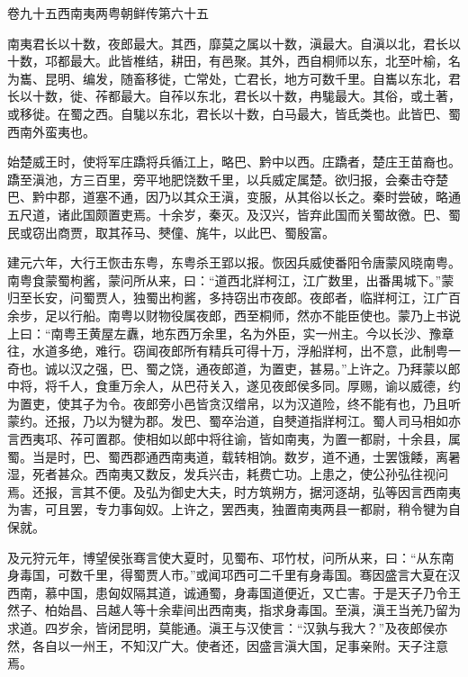 \documentclass[12pt,UTF8]{ctexbook}
\begin{document}
卷九十五西南夷两粤朝鲜传第六十五



南夷君长以十数，夜郎最大。其西，靡莫之属以十数，滇最大。自滇以北，君长以十数，邛都最大。此皆椎结，耕田，有邑聚。其外，西自桐师以东，北至叶榆，名为巂、昆明、编发，随畜移徙，亡常处，亡君长，地方可数千里。自巂以东北，君长以十数，徙、莋都最大。自莋以东北，君长以十数，冉駹最大。其俗，或土著，或移徙。在蜀之西。自駹以东北，君长以十数，白马最大，皆氐类也。此皆巴、蜀西南外蛮夷也。



始楚威王时，使将军庄蹻将兵循江上，略巴、黔中以西。庄蹻者，楚庄王苗裔也。蹻至滇池，方三百里，旁平地肥饶数千里，以兵威定属楚。欲归报，会秦击夺楚巴、黔中郡，道塞不通，因乃以其众王滇，变服，从其俗以长之。秦时尝破，略通五尺道，诸此国颇置吏焉。十余岁，秦灭。及汉兴，皆弃此国而关蜀故徼。巴、蜀民或窃出商贾，取其莋马、僰僮、旄牛，以此巴、蜀殷富。



建元六年，大行王恢击东粤，东粤杀王郢以报。恢因兵威使番阳令唐蒙风晓南粤。南粤食蒙蜀枸酱，蒙问所从来，曰：“道西北牂柯江，江广数里，出番禺城下。”蒙归至长安，问蜀贾人，独蜀出枸酱，多持窃出市夜郎。夜郎者，临牂柯江，江广百余步，足以行船。南粤以财物役属夜郎，西至桐师，然亦不能臣使也。蒙乃上书说上曰：“南粤王黄屋左纛，地东西万余里，名为外臣，实一州主。今以长沙、豫章往，水道多绝，难行。窃闻夜郎所有精兵可得十万，浮船牂柯，出不意，此制粤一奇也。诚以汉之强，巴、蜀之饶，通夜郎道，为置吏，甚易。”上许之。乃拜蒙以郎中将，将千人，食重万余人，从巴苻关入，遂见夜郎侯多同。厚赐，谕以威德，约为置吏，使其子为令。夜郎旁小邑皆贪汉缯帛，以为汉道险，终不能有也，乃且听蒙约。还报，乃以为犍为郡。发巴、蜀卒治道，自僰道指牂柯江。蜀人司马相如亦言西夷邛、莋可置郡。使相如以郎中将往谕，皆如南夷，为置一都尉，十余县，属蜀。当是时，巴、蜀西郡通西南夷道，载转相饷。数岁，道不通，士罢饿餧，离暑湿，死者甚众。西南夷又数反，发兵兴击，耗费亡功。上患之，使公孙弘往视问焉。还报，言其不便。及弘为御史大夫，时方筑朔方，据河逐胡，弘等因言西南夷为害，可且罢，专力事匈奴。上许之，罢西夷，独置南夷两县一都尉，稍令犍为自保就。



及元狩元年，博望侯张骞言使大夏时，见蜀布、邛竹杖，问所从来，曰：“从东南身毒国，可数千里，得蜀贾人市。”或闻邛西可二千里有身毒国。骞因盛言大夏在汉西南，慕中国，患匈奴隔其道，诚通蜀，身毒国道便近，又亡害。于是天子乃令王然子、柏始昌、吕越人等十余辈间出西南夷，指求身毒国。至滇，滇王当羌乃留为求道。四岁余，皆闭昆明，莫能通。滇王与汉使言：“汉孰与我大？”及夜郎侯亦然，各自以一州王，不知汉广大。使者还，因盛言滇大国，足事亲附。天子注意焉。
\end{document}
